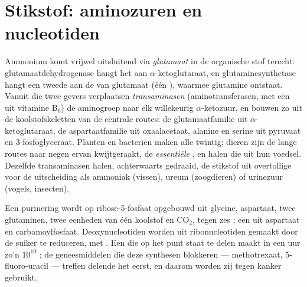 \section{Stikstof: aminozuren en nucleotiden}

\begin{definition}\label{def:b1:biosyntheses-integration:nitrogen}
Ammonium komt vrijwel uitsluitend via \emph{glutamaat} in de organische stof
terecht: glutamaatdehydrogenase hangt het aan $\alpha$-ketoglutaraat, en
glutaminesynthetase hangt een tweede aan de  van glutamaat (één ),
waarmee glutamine ontstaat. Vanuit die twee gevers verplaatsen
\emph{transaminasen} (aminotransferasen, met een  uit vitamine B$_6$) de
aminogroep naar elk willekeurig $\alpha$-ketozuur, en bouwen zo  uit de
koolstofskeletten van de centrale routes: de glutamaatfamilie uit
$\alpha$-ketoglutaraat, de aspartaatfamilie uit oxaalacetaat, alanine en serine uit
pyruvaat en 3-fosfoglyceraat. Planten en bacteriën maken alle twintig; dieren zijn
de lange routes naar negen ervan kwijtgeraakt, de \emph{essentiële} , en
halen die uit hun voedsel. Dezelfde transaminasen halen, achterwaarts gedraaid, de
stikstof uit overtollige  voor de uitscheiding als ammoniak (vissen),
ureum (zoogdieren) of urinezuur (vogels, insecten).
\end{definition}

\begin{example}[Nucleotiden]\label{ex:b1:biosyntheses-integration:nucleotides}
Een purinering wordt op ribose-5-fosfaat opgebouwd uit glycine, aspartaat, twee
glutaminen, twee eenheden van één koolstof en $\mathrm{CO_2}$, tegen zes ; een
 uit aspartaat en carbamoylfosfaat. Deoxynucleotiden worden uit
ribonucleotiden gemaakt door de suiker te reduceren, met . Een  die op het
punt staat te delen maakt in een uur zo'n $10^{10}$ ; de geneesmiddelen
die deze synthesen blokkeren --- methotrexaat, 5-fluoro-uracil --- treffen delende
 het eerst, en daarom worden zij tegen kanker gebruikt.
\end{example}

